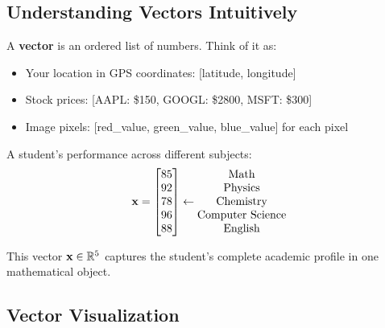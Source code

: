\documentclass{article}
\newcounter{example}
\begin{document}
\subsection{Understanding Vectors Intuitively}

A \textbf{vector} is an ordered list of numbers. Think of it as:
\begin{itemize}
    \item Your location in GPS coordinates: [latitude, longitude]
    \item Stock prices: [AAPL: \$150, GOOGL: \$2800, MSFT: \$300]
    \item Image pixels: [red\_value, green\_value, blue\_value] for each pixel
\end{itemize}

\begin{tcolorbox}[colback=blue!5!white,colframe=blue!75!black,title=Example \stepcounter{example}\#\theexample: Student Performance Vector]
A student's performance across different subjects:
$$\mathbf{x} = \begin{bmatrix} 85 \\ 92 \\ 78 \\ 96 \\ 88 \end{bmatrix} \leftarrow \begin{matrix} \text{Math} \\ \text{Physics} \\ \text{Chemistry} \\ \text{Computer Science} \\ \text{English} \end{matrix}$$

This vector $\mathbf{x} \in \mathbb{R}^5$ captures the student's complete academic profile in one mathematical object.
\end{tcolorbox}

\subsection{Vector Visualization}

\begin{center}
\end{center}
\end{document}
